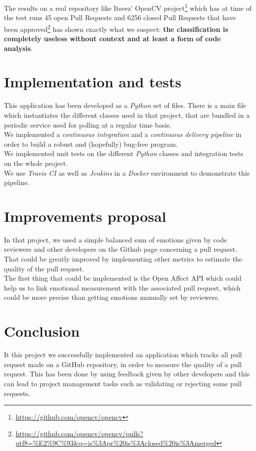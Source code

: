 \documentclass[journal]{IEEEtran}
\begin{document}
The results on a real repository like Itseez' OpenCV project\footnote{\url{https://github.com/opencv/opencv}} which has at time of the test runs 45 open Pull Requests and 6256 closed Pull Requests that have been approved\footnote{\url{https://github.com/opencv/opencv/pulls?utf8=\%E2\%9C\%93&q=is\%3Apr\%20is\%3Aclosed\%20is\%3Amerged}} has shown exactly what we suspect: \textbf{the classification is completely useless without context and at least a form of code analysis}.

\section{Implementation and tests}
This application has been developed as a \emph{Python} set of files. There is a main file which instantiates the different classes used in that project, that are bundled in a periodic service used for polling at a regular time basis.\\

We implemented a \emph{continuous integration} and a \emph{continuous delivery pipeline} in order to build a robust and (hopefully) bug-free program. \\

We implemented unit tests on the different \emph{Python} classes and integration tests on the whole project.\\

We use \emph{Travis CI} as well as \emph{Jenkins} in a \emph{Docker} environment to demonstrate this pipeline.

\section{Improvements proposal}
In that project, we used a simple balanced sum of emotions given by code reviewers and other developers on the Github page concerning a pull request. That could be greatly improved by implementing other metrics to estimate the quality of the pull request.\\

The first thing that could be implemented is the Open Affect API which could help us to link emotional measurement with the associated pull request, which could be more precise than getting emotions manually set by reviewers.

\section{Conclusion}
It this project we successfully implemented an application which tracks all pull request made on a GitHub repository, in order to measure the quality of a pull request. This has been done by using feedback given by other developers and this can lead to project management tasks such as validating or rejecting some pull requests.\\
\end{document}
